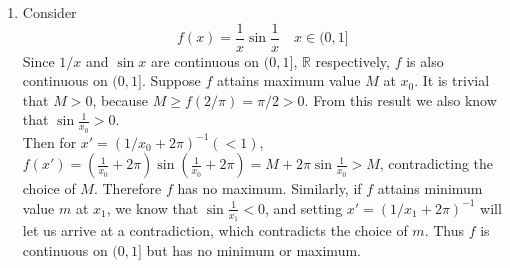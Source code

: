\documentclass[11pt]{report}
\newcommand{\inv}{^{-1}}
\newcommand{\R}{\mathbb{R}}
\begin{document}
\begin{enumerate}
\item Consider $$f(x) = \frac{1}{x}\sin \frac{1}{x} \quad x\in (0, 1]$$
Since $1/x$ and $\sin x$ are continuous on $(0, 1]$, $\R$ respectively, $f$ is also continuous on $(0, 1]$. Suppose $f$ attains maximum value $M$ at $x_0$. It is trivial that $M > 0$, because $M \geq f(2/\pi) = \pi/2 > 0$. From this result we also know that $\sin\frac{1}{x_0} > 0$.\\
Then for $x' = \left(1/x_0+ 2\pi \right)\inv (<1)$, $f(x') = \left(\frac{1}{x_0} + 2\pi\right)\sin\left(\frac{1}{x_0}+2\pi\right) = M + 2\pi \sin \frac{1}{x_0} > M$, contradicting the choice of $M$. Therefore $f$ has no maximum. Similarly, if $f$ attains minimum value $m$ at $x_1$, we know that $\sin \frac{1}{x_1} < 0$, and setting $x' = (1/x_1 + 2\pi)\inv$ will let us arrive at a contradiction, which contradicts the choice of $m$. Thus $f$ is continuous on $(0, 1]$ but has no minimum or maximum.



\end{enumerate}
\end{document}
